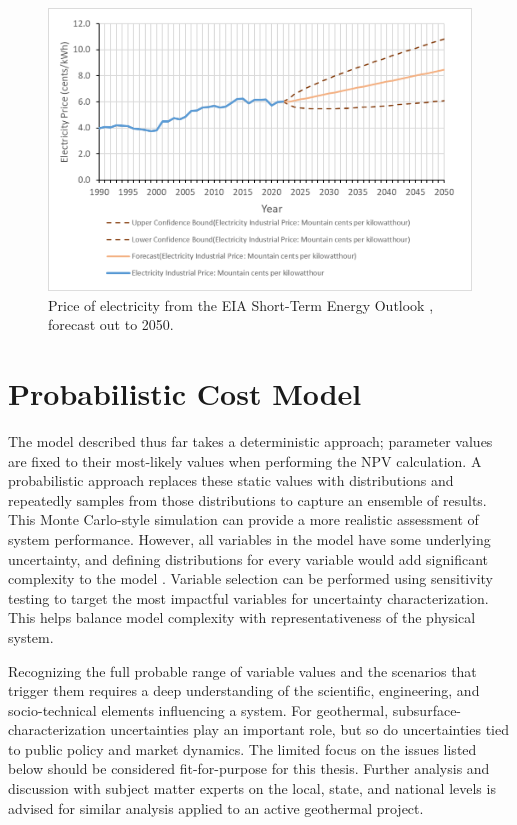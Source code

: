 \begin{figure}
\centering
\includegraphics[width=.8\textwidth]{templates/images/Figure-EIA_Electricity_Forecast.png}
\caption[Electricity price forecast]{Price of electricity from the EIA Short-Term Energy Outlook \protect\citep{eia_short-term_2021}, forecast out to 2050.}
\label{fig:electricity_pricing}
\end{figure}

\section{Probabilistic Cost Model}\label{ch4:cm_uncertainties}

The model described thus far takes a deterministic approach; parameter values are fixed to their most-likely values when performing the NPV calculation. A probabilistic approach replaces these static values with distributions and repeatedly samples from those distributions to capture an ensemble of results. This Monte Carlo-style simulation can provide a more realistic assessment of system performance. However, all variables in the model have some underlying uncertainty, and defining distributions for every variable would add significant complexity to the model%
. Variable selection can be performed using sensitivity testing to target the most impactful variables for uncertainty characterization. This helps balance model complexity with representativeness of the physical system. 

Recognizing the full probable range of variable values and the scenarios that trigger them requires a deep understanding of the scientific, engineering, and socio-technical elements influencing a system. For geothermal, subsurface-characterization uncertainties play an important role, but so do uncertainties tied to public policy and market dynamics. The limited focus on the issues listed below should be considered fit-for-purpose for this thesis. Further analysis and discussion with subject matter experts on the local, state, and national levels is advised for similar analysis applied to an active geothermal project.

